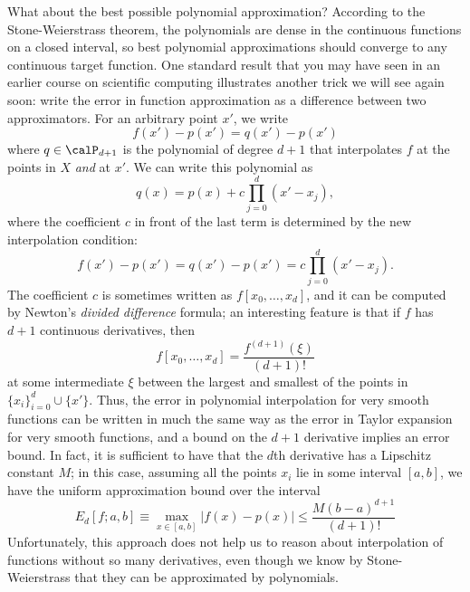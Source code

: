 \documentclass[12pt, leqno]{article} %
\begin{document}
What about the best possible polynomial approximation?  According to
the Stone-Weierstrass theorem, the polynomials are dense in the
continuous functions on a closed interval, so best polynomial
approximations should converge to any continuous target function.  One
standard result that you may have seen in an earlier course on
scientific computing illustrates another trick we will see again soon:
write the error in function approximation as a difference between
two approximators.  For an arbitrary point $x'$, we write
\[
  f(x')-p(x') = q(x')-p(x')
\]
where $q \in \calP_{d+1}$ is the polynomial of degree $d+1$ that
interpolates $f$ at the points in $X$ {\em and} at $x'$.  We can write
this polynomial as
\[
  q(x) = p(x) + c \prod_{j=0}^d (x'-x_j),
\]
where the coefficient $c$ in front of the last term is determined by
the new interpolation condition:
\[
  f(x')-p(x') = q(x')-p(x') = c \prod_{j=0}^d (x'-x_j).
\]
The coefficient $c$ is sometimes written as $f[x_0, \ldots, x_d]$,
and it can be computed by Newton's {\em divided difference} formula;
an interesting feature is that if $f$ has $d+1$ continuous
derivatives, then
\[
  f[x_0, \ldots, x_d] = \frac{f^{(d+1)}(\xi)}{(d+1)!}
\]
at some intermediate $\xi$ between the largest and smallest of the
points in $\{x_i\}_{i=0}^d \cup \{x'\}$.  Thus, the error
in polynomial interpolation for very smooth functions can be written
in much the same way as the error in Taylor expansion for very smooth
functions, and a bound on the $d+1$ derivative implies an error bound.
In fact, it is sufficient to have that the $d$th derivative has a
Lipschitz constant $M$; in this case, assuming all the points $x_i$
lie in some interval $[a,b]$, we have the uniform approximation
bound over the interval
\[
  E_d[f; a, b] \equiv \max_{x \in [a,b]} |f(x)-p(x)|
  \leq \frac{M (b-a)^{d+1}}{(d+1)!}
\]
Unfortunately, this approach does not help us to reason about
interpolation of functions without so many derivatives, even though
we know by Stone-Weierstrass that they can be approximated by polynomials.
\end{document}
